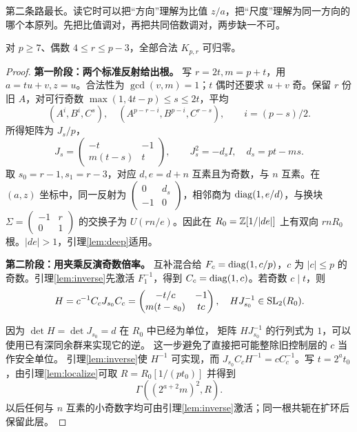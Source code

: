 第二条路最长。读它时可以把“方向”理解为比值 $z/a$，把“尺度”理解为同一方向的哪个本原列。先把比值调对，再把共同倍数调对，两步缺一不可。
\begin{lemma}[偶数内部的完整构造]\label{lem:even-core}
对 $p\ge7$、偶数 $4\le r\le p-3$，全部合法 $K_{p,r}$ 可归零。
\end{lemma}
\begin{proof}

\par\noindent\textbf{第一阶段：两个标准反射给出根。}
写 $r=2t,m=p+t$，用 $a=tu+v,z=u$。合法性为 $\gcd(v,m)=1$；$t$ 偶时还要求 $u+v$ 奇。保留 $r$ 份旧 $A$，对可行奇数 $\max(1,4t-p)\le s\le2t$，平均
\begin{equation}\label{eq:even-reflection}
(A^i,B^i,C^s),\quad(A^{p-r-i},B^{p-i},C^{r-s}),\qquad i=(p-s)/2.
\end{equation}
所得矩阵为 $J_s/p$，
\[
J_s=\begin{pmatrix}-t&-1\\m(t-s)&t\end{pmatrix},\qquad
J_s^2=-d_sI,\quad d_s=pt-ms.
\]
取 $s_0=r-1,s_1=r-3$，对应 $d,e=d+n$ 互素且为奇数，与 $n$ 互素。在 $(a,z)$ 坐标中，同一反射为 $\left(\begin{smallmatrix}0&d_s\\-1&0\end{smallmatrix}\right)$，相邻商为 $\operatorname{diag}(1,e/d)$，与换块 $\Sigma=\left(\begin{smallmatrix}-1&r\\0&1\end{smallmatrix}\right)$ 的交换子为 $U(rn/e)$。因此在 $R_0=\mathbb Z[1/|de|]$ 上有双向 $rnR_0$ 根。$|de|>1$，引理\ref{lem:deep}适用。


\par\noindent\textbf{第二阶段：用夹乘反演奇数倍率。}
互补混合给 $F_c=\operatorname{diag}(1,c/p)$，$c$ 为 $|c|\le p$ 的奇数。引理\ref{lem:inverse}先激活 $F_1^{-1}$，得到 $C_c=\operatorname{diag}(1,c)$。若奇数 $c\mid t$，则
\[
H=c^{-1}C_cJ_{s_0}C_c
=\begin{pmatrix}-t/c&-1\\m(t-s_0)&tc\end{pmatrix},\quad
HJ_{s_0}^{-1}\in\operatorname{SL}_2(R_0).
\]

因为 $\det H=\det J_{s_0}=d$ 在 $R_0$ 中已经为单位，
矩阵 $HJ_{s_0}^{-1}$ 的行列式为 $1$，可以使用已有深同余群来实现它的逆。
这一步避免了直接把可能整除旧控制层的 $c$ 当作安全单位。
引理\ref{lem:inverse}使 $H^{-1}$ 可实现，而 $J_{s_0}C_cH^{-1}=cC_c^{-1}$。写 $t=2^a t_0$，由引理\ref{lem:localize}可取 $R=R_0[1/(pt_0)]$ 并得到
\begin{equation}\label{eq:even-deep}
\Gamma((2^{a+2}m)^2,R).
\end{equation}
以后任何与 $n$ 互素的小奇数字均可由引理\ref{lem:inverse}激活；同一根共轭在扩环后保留此层。



\end{proof}

